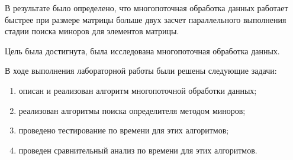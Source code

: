 \hspace{\parindent}В результате было определено, что многопоточная обработка данных работает быстрее при размере матрицы больше двух засчет параллельного выполнения стадии поиска миноров для элементов матрицы.

\hspace{\parindent}Цель была достигнута, была исследована многопоточная обработка данных.

В ходе выполнения лабораторной работы были решены следующие задачи:
\begin{enumerate}
	\item описан и реализован алгоритм многопоточной обработки данных;
	\item реализован алгоритмы поиска определителя методом миноров;
	\item проведено тестирование по времени для этих алгоритмов;
	\item проведен сравнительный анализ по времени для этих алгоритмов.
\end{enumerate}